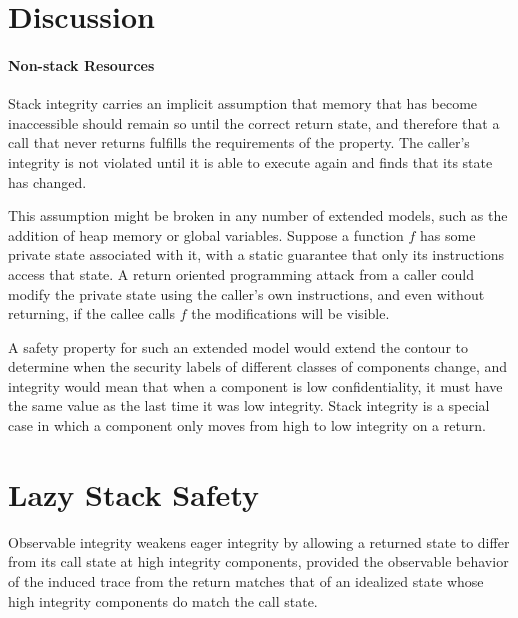 \documentclass[acmsmall,review,anonymous]{acmart}\settopmatter{printfolios=true,printccs=false,printacmref=false}
\begin{document}
\section{Discussion}



  \paragraph{Non-stack Resources}

    Stack integrity carries an implicit assumption that memory that has
    become inaccessible should remain so until the correct return state, and
    therefore that a call that never returns fulfills the requirements of
    the property. The caller's integrity is not violated until it is able
    to execute again and finds that its state has changed.

    This assumption might be broken in any number of extended models, such as
    the addition of heap memory or global variables. Suppose a function \(f\)
    has some private state associated with it, with a static guarantee that
    only its instructions access that state. A return oriented programming
    attack from a caller could modify the private state using the caller's own
    instructions, and even without returning, if the callee calls \(f\) the
    modifications will be visible.

    A safety property for such an extended model would extend the contour to
    determine when the security labels of different classes of components
    change, and integrity would mean that when a component is low
    confidentiality, it must have the same value as the last time it was low
    integrity. Stack integrity is a special case in which a component only
    moves from high to low integrity on a return.

\section{Lazy Stack Safety}


      Observable integrity weakens eager integrity by allowing a returned state
      to differ from its call state at high integrity components, provided the
      observable behavior of the induced trace from the return matches that of
      an idealized state whose high integrity components do match the call
      state.
\end{document}
